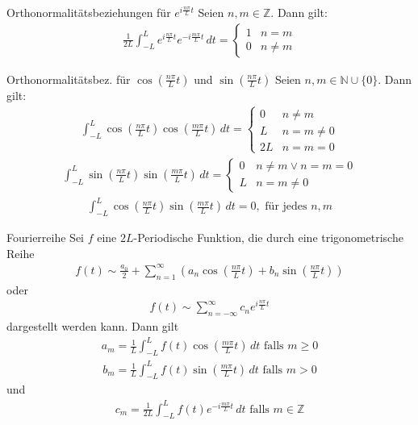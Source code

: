 \documentclass[a4paper,10pt]{article}
\begin{document}
\begin{subbox}{Orthonormalitätsbeziehungen für $e^{i\frac{n\pi}{L}t}$}
  Seien \(n,m\in\mathbb{Z}\). Dann gilt: \begin{align*} \frac{1}{2L}\int_{-L}^L e^{ i \frac{n\pi}{L}t}e^{- i \frac{m\pi}{L}t}\,dt =\begin{cases} 1&n=m\\ 0&n\neq m \end{cases} \end{align*}
\end{subbox}

\begin{subbox}{Orthonormalitätsbez. für $\cos(\frac{n\pi}{L}t)$ und $\sin(\frac{n\pi}{L}t)$}
  Seien \(n,m\in\mathbb{N}\cup\{0\}\). Dann gilt:
\begin{align*}\int_{-L}^L\cos\left(\frac{n\pi}{L}t\right)\cos\left(\frac{m\pi}{L}t\right)\,dt=\begin{cases}0&n\neq m\\L&n=m\neq0\\2L&n=m=0 \end{cases} \end{align*}
\begin{align*} \int_{-L}^L\sin\left(\frac{n\pi}{L}t\right)\sin\left(\frac{m\pi}{L}t\right)\,dt=\begin{cases}0&n\neq m \lor n = m = 0\\L&n=m\neq0 \end{cases} \end{align*}
\begin{align*} \int_{-L}^L\cos\left(\frac{n\pi}{L}t\right)\sin\left(\frac{m\pi}{L}t\right)\,dt=0, \text{ für jedes }n,m  \end{align*}

\end{subbox}

\begin{mainbox}{Fourierreihe}
  Sei \(f\) eine \(2L\)-Periodische Funktion, die durch eine trigonometrische Reihe \begin{align*} f(t)\sim \frac{a_0}{2}+\sum_{n=1}^\infty\left(a_n\cos\left(\frac{n\pi}{L}t\right)+b_n\sin\left(\frac{n\pi}{L}t\right)\right)  \end{align*} 
  oder 
  \begin{align*} f(t)\sim \sum_{n=-\infty}^\infty c_ne^{ i\frac{n\pi}{L}t} \end{align*} dargestellt werden kann. Dann gilt 
  \begin{align*} a_m=\frac{1}{L}\int_{-L}^Lf(t)\cos\left(\frac{m\pi}{L}t\right)\,dt \text{ falls } m\geq 0  \end{align*} \begin{align*} b_m=\frac{1}{L}\int_{-L}^Lf(t)\sin\left(\frac{m\pi}{L}t\right)\,dt \text{ falls } m>0  \end{align*} und \begin{align*} c_m=\frac{1}{2L}\int_{-L}^Lf(t)e^{- i \frac{m\pi}{L} t}\,dt \text{ falls } m\in\mathbb{Z}  \end{align*}
\end{mainbox}
\end{document}
